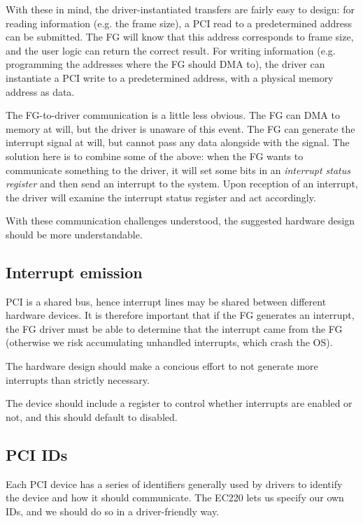\documentclass[12pt]{article}
\begin{document}
With these in mind, the driver-instantiated transfers are fairly easy to design: for reading information (e.g. the frame size), a PCI read to a predetermined address can be submitted. The FG will know that this address corresponds to frame size, and the user logic can return the correct result. For writing information (e.g. programming the addresses where the FG should DMA to), the driver can instantiate a PCI write to a predetermined address, with a physical memory address as data.

The FG-to-driver communication is a little less obvious. The FG can DMA to memory at will, but the driver is unaware of this event. The FG can generate the interrupt signal at will, but cannot pass any data alongside with the signal. The solution here is to combine some of the above: when the FG wants to communicate something to the driver, it will set some bits in an \textit{interrupt status register} and then send an interrupt to the system. Upon reception of an interrupt, the driver will examine the interrupt status register and act accordingly.

With these communication challenges understood, the suggested hardware design should be more understandable.

\subsection{Interrupt emission}

PCI is a shared bus, hence interrupt lines may be shared between different hardware devices. It is therefore important that if the FG generates an interrupt, the FG driver must be able to determine that the interrupt came from the FG (otherwise we risk accumulating unhandled interrupts, which crash the OS).

The hardware design should make a concious effort to not generate more interrupts than strictly necessary.

The device should include a register to control whether interrupts are enabled or not, and this should default to disabled.

\subsection{PCI IDs}

Each PCI device has a series of identifiers generally used by drivers to identify the device and how it should communicate. The EC220 lets us specify our own IDs, and we should do so in a driver-friendly way.
\end{document}
